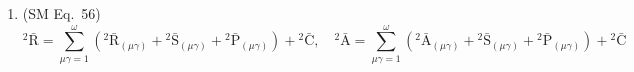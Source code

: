 \documentclass[12pt]{article}
\begin{document}
\begin{enumerate}[label=(\arabic*), series=formellist]
\[\begin{aligned}
    &\quad + \sum_{\mu\gamma\chi\lambda=1}^{\omega} \left( \mathrm{K}^\mathrm{i}_{\mathrm{s,l}}(\mu\gamma)\mathrm{K}^\mathrm{s}_{\mathrm{km}}(\chi\lambda) - \mathrm{K}^\mathrm{i}_{\mathrm{sm}}(\mu\gamma)\mathrm{K}^\mathrm{s}_{\mathrm{kl}}(\chi\lambda) \right) + \sum_{\mu\gamma\chi\lambda=1}^{\omega} \left( \mathrm{K}^\mathrm{i}_{\mathrm{s,l}}(\mu\gamma)\left\{ \begin{smallmatrix} \mathrm{s} \\ \mathrm{k\ m} \end{smallmatrix} \right\}^{(\chi)}_{(\lambda)} + \right. \\
    &\quad \left. + \left\{ \begin{smallmatrix} \mathrm{i} \\ \mathrm{s\ l} \end{smallmatrix} \right\}^{(\mu)}_{(\gamma)}\mathrm{K}^\mathrm{s}_{\mathrm{km}}(\chi\lambda) - \mathrm{K}^\mathrm{i}_{\mathrm{sm}}(\mu\gamma)\left\{ \begin{smallmatrix} \mathrm{s} \\ \mathrm{k\ l} \end{smallmatrix} \right\}^{(\chi)}_{(\lambda)} - \left\{ \begin{smallmatrix} \mathrm{i} \\ \mathrm{s\ m} \end{smallmatrix} \right\}^{(\mu)}_{(\gamma)}\mathrm{K}^\mathrm{s}_{\mathrm{kl}}(\chi\lambda) \right) = \\
    &= \sum_{\mu\gamma=1}^{\omega} \left( \mathrm{R}^\mathrm{i}_{(\mu\gamma)\mathrm{klm}} + \mathrm{S}^\mathrm{i}_{(\mu\gamma)\mathrm{klm}} + \mathrm{P}^\mathrm{i}_{(\mu\gamma)\mathrm{klm} } \right) + \mathrm{C}^\mathrm{i}_{\mathrm{klm}}, \quad {}^4\bar{\mathrm{R}} = \sum_{\mu\gamma=1}^{\omega} \left( {}^4\bar{\mathrm{R}}_{(\mu\gamma)} + {}^4\bar{\mathrm{S}}_{(\mu\gamma)} + {}^4\bar{\mathrm{P}}_{(\mu\gamma)} \right) + {}^4\bar{\mathrm{C}}
    \end{aligned}
    \]

    \item (SM Eq.\ 56) 
    \[
    {}^2\bar{\mathrm{R}} = \sum_{\mu\gamma=1}^{\omega} \left( {}^2\bar{\mathrm{R}}_{(\mu\gamma)} + {}^2\bar{\mathrm{S}}_{(\mu\gamma)} + {}^2\bar{\mathrm{P}}_{(\mu\gamma)} \right) + {}^2\bar{\mathrm{C}}, \quad {}^2\bar{\mathrm{A}} = \sum_{\mu\gamma=1}^{\omega} \left( {}^2\bar{\mathrm{A}}_{(\mu\gamma)} + {}^2\bar{\mathrm{S}}_{(\mu\gamma)} + {}^2\bar{\mathrm{P}}_{(\mu\gamma)} \right) + {}^2\bar{\mathrm{C}}
    \]


\end{enumerate}
\end{document}
